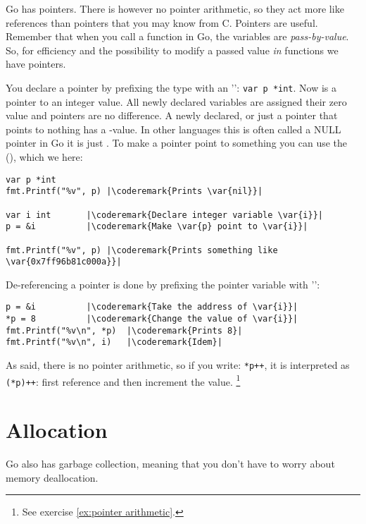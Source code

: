 \noindent{}
Go has pointers.
There is however no pointer arithmetic, so they act more like
references than pointers that you may know from C. Pointers 
are useful.
Remember that when you call a function in Go, the variables are
\emph{pass-by-value}. So, for efficiency and the possibility to modify a
passed value \emph{in} functions we have pointers.

You declare a pointer by prefixing the type with an
'\key{*}':
\lstinline{var p *int}. Now  is a pointer to an integer value.
All newly declared variables are assigned their zero value and pointers
are no difference. A newly declared, or just a pointer that points to
nothing has a -value. In other languages this is often called
a NULL pointer in Go it is just . To make 
a pointer point to something you can use the 
(\func{\&}), which we here:
\begin{lstlisting}[caption=Use of a pointer,label=src:pointers]
var p *int
fmt.Printf("%v", p) |\coderemark{Prints \var{nil}}|

var i int	    |\coderemark{Declare integer variable \var{i}}|
p = &i		    |\coderemark{Make \var{p} point to \var{i}}|

fmt.Printf("%v", p) |\coderemark{Prints something like \var{0x7ff96b81c000a}}|
\end{lstlisting}
De-referencing a pointer is done by prefixing the pointer variable with
'\type{*}':
\begin{lstlisting}[caption=Dereferencing a pointer,label=src:deref]
p = &i			|\coderemark{Take the address of \var{i}}|
*p = 8			|\coderemark{Change the value of \var{i}}|
fmt.Printf("%v\n", *p)  |\coderemark{Prints 8}|
fmt.Printf("%v\n", i)	|\coderemark{Idem}|
\end{lstlisting}

\label{main:pointer arithmetic}
As said, there is no pointer arithmetic, so if you write:
\lstinline{*p++}, it is interpreted as \lstinline{(*p)++}: first
reference and then increment the value.
\footnote{See exercise \ref{ex:pointer arithmetic}.}

\section{Allocation}
Go also has garbage collection, meaning that you don't have to worry about
memory deallocation. 

